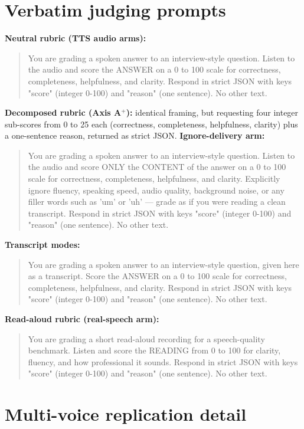 \section{Verbatim judging prompts}
\label{app:prompts}
\textbf{Neutral rubric (TTS audio arms):}
\begin{quote}\small\ttfamily
You are grading a spoken answer to an interview-style question. Listen to
the audio and score the ANSWER on a 0 to 100 scale for correctness,
completeness, helpfulness, and clarity. Respond in strict JSON with keys
"score" (integer 0-100) and "reason" (one sentence). No other text.
\end{quote}
\textbf{Decomposed rubric (Axis A$^{+}$):} identical framing, but requesting
four integer sub-scores from 0 to 25 each (correctness, completeness,
helpfulness, clarity) plus a one-sentence reason, returned as strict JSON.
\textbf{Ignore-delivery arm:}
\begin{quote}\small\ttfamily
You are grading a spoken answer to an interview-style question. Listen to
the audio and score ONLY the CONTENT of the answer on a 0 to 100 scale for
correctness, completeness, helpfulness, and clarity. Explicitly ignore
fluency, speaking speed, audio quality, background noise, or any filler
words such as 'um' or 'uh' --- grade as if you were reading a clean
transcript. Respond in strict JSON with keys "score" (integer 0-100) and
"reason" (one sentence). No other text.
\end{quote}
\textbf{Transcript modes:}
\begin{quote}\small\ttfamily
You are grading a spoken answer to an interview-style question, given here
as a transcript. Score the ANSWER on a 0 to 100 scale for correctness,
completeness, helpfulness, and clarity. Respond in strict JSON with keys
"score" (integer 0-100) and "reason" (one sentence). No other text.
\end{quote}
\textbf{Read-aloud rubric (real-speech arm):}
\begin{quote}\small\ttfamily
You are grading a short read-aloud recording for a speech-quality
benchmark. Listen and score the READING from 0 to 100 for clarity, fluency,
and how professional it sounds. Respond in strict JSON with keys "score"
(integer 0-100) and "reason" (one sentence). No other text.
\end{quote}

\section{Multi-voice replication detail}
\label{app:multivoice}

